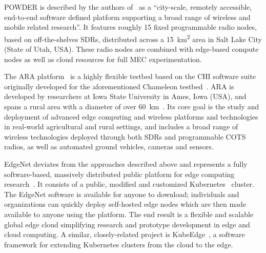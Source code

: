 \gls{POWDER} is described by the authors of~\cite{breen2020powder} as a ``city-scale, remotely accessible, end-to-end software defined platform supporting a broad range of wireless and mobile related research''.
It features roughly \num{15} fixed programmable radio nodes, based on off-the-shelves \glspl{SDR}, distributed across a \SI{15}{\kilo\meter\squared} area in Salt Lake City (State of Utah, \gls{USA}).
These radio nodes are combined with edge-based compute nodes as well as cloud resources for full \gls{MEC} experimentation.

The \gls{ARA} platform~\cite{zhang2022ara} is a highly flexible testbed based on the \gls{CHI} software suite originally developed for the aforementioned Chameleon testbed~\cite{keahey2020lessons}.
\gls{ARA} is developed by researchers at Iowa State University in Ames, Iowa (\gls{USA}), and spans a rural area with a diameter of over \SI{60}{\kilo\meter}~\cite{zhang2022ara}.
Its core goal is the study and deployment of advanced edge computing and wireless platforms and technologies in real-world agricultural and rural settings, and includes a broad range of wireless technologies deployed through both \glspl{SDR} and programmable \gls{COTS} radios, as well as automated ground vehicles, cameras and sensors.

EdgeNet deviates from the approaches described above and represents a fully software-based, massively distributed public platform for edge computing research~\cite{cappos2018edgenet,senel2021edgenet1,senel2021edgenet2}.
It consists of a public, modified and customized Kubernetes~\cite{kubernetes} cluster.
The EdgeNet software is available for anyone to download;
individuals and organizations can quickly deploy self-hosted edge nodes which are then made available to anyone using the platform.
The end result is a flexible and scalable global edge cloud simplifying research and prototype development in edge and cloud computing.
A similar, closely-related project is KubeEdge~\cite{xiong2018extend}, a software framework for extending Kubernetes clusters from the cloud to the edge.

